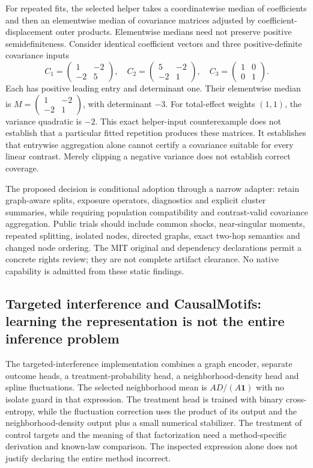 For repeated fits, the selected helper takes a coordinatewise median of coefficients and then an elementwise median of covariance matrices adjusted by coefficient-displacement outer products. Elementwise medians need not preserve positive semidefiniteness. Consider identical coefficient vectors and three positive-definite covariance inputs
\[
 C_1=\begin{pmatrix}1&-2\\-2&5\end{pmatrix},\quad
 C_2=\begin{pmatrix}5&-2\\-2&1\end{pmatrix},\quad
 C_3=\begin{pmatrix}1&0\\0&1\end{pmatrix}.
\]
Each has positive leading entry and determinant one. Their elementwise median is $M=\left(\begin{smallmatrix}1&-2\\-2&1\end{smallmatrix}\right)$, with determinant $-3$. For total-effect weights $(1,1)$, the variance quadratic is $-2$. This exact helper-input counterexample does not establish that a particular fitted repetition produces these matrices. It establishes that entrywise aggregation alone cannot certify a covariance suitable for every linear contrast. Merely clipping a negative variance does not establish correct coverage.~\citep{exec25_pnet_choice}

The proposed decision is conditional adoption through a narrow adapter: retain graph-aware splits, exposure operators, diagnostics and explicit cluster summaries, while requiring population compatibility and contrast-valid covariance aggregation. Public trials should include common shocks, near-singular moments, repeated splitting, isolated nodes, directed graphs, exact two-hop semantics and changed node ordering. The MIT original and dependency declarations permit a concrete rights review; they are not complete artifact clearance. No native capability is admitted from these static findings.~\citep{exec25_pnet_dml,exec25_pnet_choice}

\subsection{Targeted interference and CausalMotifs: learning the representation is not the entire inference problem}

The targeted-interference implementation combines a graph encoder, separate outcome heads, a treatment-probability head, a neighborhood-density head and spline fluctuations. The selected neighborhood mean is $AD/(A\mathbf1)$ with no isolate guard in that expression. The treatment head is trained with binary cross-entropy, while the fluctuation correction uses the product of its output and the neighborhood-density output plus a small numerical stabilizer. The treatment of control targets and the meaning of that factorization need a method-specific derivation and known-law comparison. The inspected expression alone does not justify declaring the entire method incorrect.~\citep{exec25_pnet_targeted}

